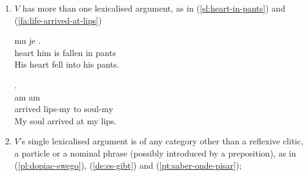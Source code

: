 \documentclass[output=paper,
modfonts,
]{langscibook}
\begin{document}
\begin{enumerate}
\item\label{many-lex-arg} $V$ has more than one lexicalised argument, as in (\ref{sl:heart-in-pants}) and (\ref{fa:life-arrived-at-lips})


\ea \label{sl:heart-in-pants}
\settowidth {}
\gll {} mu je   . \\
heart him is fallen in pants\\ 
\glt His heart fell into his pants. 
\z

\ea \label{fa:life-arrived-at-lips}
\settowidth {}
\glll . \underline{}  \underline{}  \underline{} \\
 am  am\\
arrived lips-my to soul-my\\ 
\glt My soul arrived at my lips. 
\z



\item $V$'s single lexicalised argument is of any category other than a reflexive clitic, a particle or a nominal phrase (possibly introduced by a preposition), as in (\ref{pl:dopiac-swego}), (\ref{de:es-gibt}) and (\ref{pt:saber-onde-pisar});



\end{enumerate}
\end{document}
